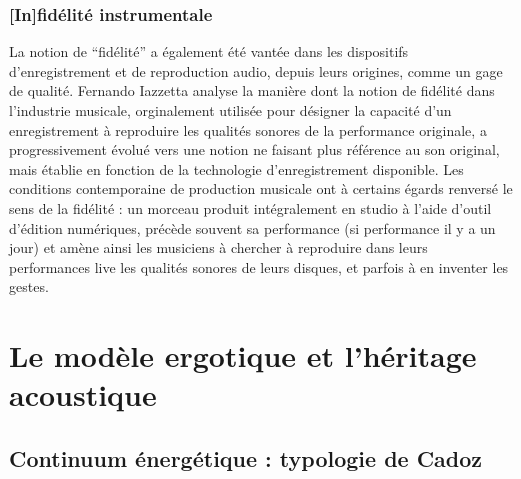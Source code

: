 \subsubsection{[In]fidélité instrumentale}

\noindent La notion de ``fidélité'' a également été vantée dans les dispositifs d'enregistrement et de reproduction audio, depuis leurs origines, comme un gage de qualité. Fernando Iazzetta \cite{iazzetta_meaning_2000} analyse la manière dont la notion de fidélité dans l'industrie musicale, orginalement utilisée pour désigner la capacité d'un enregistrement à reproduire les qualités sonores de la performance originale, a progressivement évolué vers une notion ne faisant plus référence au son original, mais établie en fonction de la technologie d'enregistrement disponible. Les conditions contemporaine de production musicale ont à certains égards renversé le sens de la fidélité : un morceau produit intégralement en studio à l'aide d'outil d'édition numériques, précède souvent sa performance (si performance il y a un jour) et amène ainsi les musiciens à chercher à reproduire dans leurs performances live les qualités sonores de leurs disques, et parfois à en inventer les gestes.


\section{Le modèle ergotique et l'héritage acoustique}
\label{sec:gesture:ergotic}

\subsection{Continuum énergétique : typologie de Cadoz}

